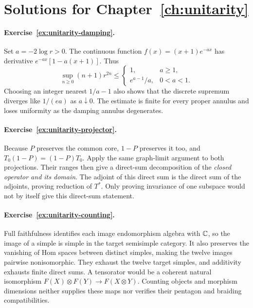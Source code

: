 \section{Solutions for Chapter~\ref{ch:unitarity}}

\paragraph{Exercise~\ref{ex:unitarity-damping}.}
\label{sol:ex:unitarity-damping}
Set $a=-2\log r>0$. The continuous function
$f(x)=(x+1)e^{-ax}$ has derivative
$e^{-ax}[1-a(x+1)]$. Thus
\[
 \sup_{n\ge0}(n+1)r^{2n}\le
 \begin{cases}
 1,&a\ge1,\\
 e^{a-1}/a,&0<a<1.
 \end{cases}
\]
Choosing an integer nearest $1/a-1$ also shows that the
discrete supremum diverges like $1/(ea)$ as $a\downarrow0$.
The estimate is finite for every proper annulus and loses
uniformity as the damping annulus degenerates.



\paragraph{Exercise~\ref{ex:unitarity-projector}.}
\label{sol:ex:unitarity-projector}
Because $P$ preserves the common core, $1-P$ preserves it too,
and $T_0(1-P)=(1-P)T_0$. Apply the same graph-limit
argument to both projections. Their ranges then give a
direct-sum decomposition of the \emph{closed operator and its
domain}. The adjoint of this direct sum is the direct sum of
the adjoints, proving reduction of $T^*$. Only proving
invariance of one subspace would not by itself give this
direct-sum statement.



\paragraph{Exercise~\ref{ex:unitarity-counting}.}
\label{sol:ex:unitarity-counting}
Full faithfulness identifies each image endomorphism algebra
with $\mathbb C$, so the image of a simple is simple in the target
semisimple category. It also preserves the vanishing of
Hom spaces between distinct simples, making the twelve
images pairwise nonisomorphic. They exhaust the twelve target
simples, and additivity exhausts finite direct sums.
A tensorator would be a coherent natural isomorphism
$F(X)\otimes F(Y)\to F(X\otimes Y)$.
Counting objects and morphism dimensions neither supplies
these maps nor verifies their pentagon and braiding compatibilities.



